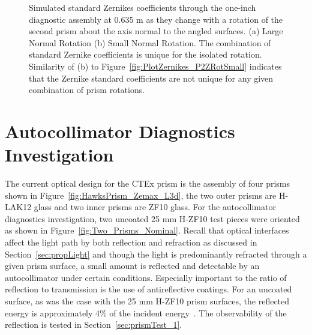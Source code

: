 \begin{figure}[H]	%
\begin{center}
\caption{\textmd{Simulated standard Zernikes coefficients through the one-inch diagnostic assembly at 0.635 \textmu m as they change with a rotation of the second prism about the axis normal to the angled surfaces. (a) Large Normal Rotation (b) Small Normal Rotation. The combination of standard Zernike coefficients is unique for the isolated rotation. Similarity of (b) to Figure~\ref{fig:PlotZernikes_P2ZRotSmall} indicates that the Zernike standard coefficients are not unique for any given combination of prism rotations.}}
\label{fig:NormalRotZernikes}
\end{center}
\end{figure}


\section{Autocollimator Diagnostics Investigation}
\label{sec:autocollimatorDiagnostics}

The current optical design for the \ac{CTEx} prism is the assembly of four prisms shown in Figure~\ref{fig:HawksPrism_Zemax_L3d}, the two outer prisms are H-LAK12 glass and two inner prisms are ZF10 glass. For the autocollimator diagnostics investigation, two uncoated 25 mm H-ZF10 test pieces were oriented as shown in Figure~\ref{fig:Two_Prisms_Nominal}. Recall that optical interfaces affect the light path by both reflection and refraction as discussed in Section~\ref{sec:propLight} and though the light is predominantly refracted through a given prism surface, a small amount is reflected and detectable by an autocollimator under certain conditions. Especially important to the ratio of reflection to transmission is the use of antireflective coatings. For an uncoated surface, as was the case with the 25 mm H-ZF10 prism surfaces, the  reflected energy is approximately 4\% of the incident energy~\cite{Hecht}. The observability of the reflection is tested in Section~\ref{sec:prismTest_1}.

